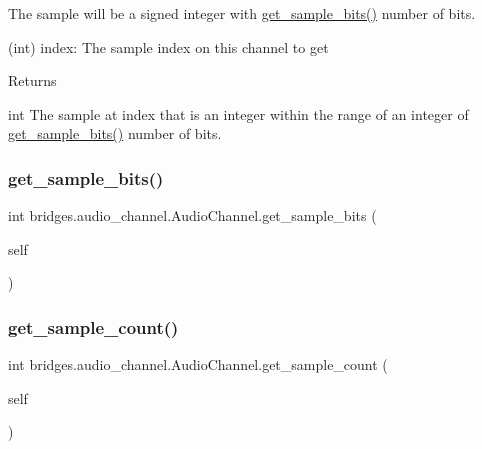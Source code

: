 The sample will be a signed integer with \mbox{\hyperlink{classbridges_1_1audio__channel_1_1_audio_channel_a6ee6a46e925354fd26f8f67e3357c2b4}{get\+\_\+sample\+\_\+bits()}} number of bits. \begin{DoxyVerb}           (int) index: The sample index on this channel to get
\end{DoxyVerb}
 \begin{DoxyReturn}{Returns}


int The sample at index that is an integer within the range of an integer of \mbox{\hyperlink{classbridges_1_1audio__channel_1_1_audio_channel_a6ee6a46e925354fd26f8f67e3357c2b4}{get\+\_\+sample\+\_\+bits()}} number of bits. 
\end{DoxyReturn}
\mbox{\label{classbridges_1_1audio__channel_1_1_audio_channel_a6ee6a46e925354fd26f8f67e3357c2b4}} 
\subsubsection{\texorpdfstring{get\_sample\_bits()}{get\_sample\_bits()}}
{\footnotesize\ttfamily  int bridges.\+audio\+\_\+channel.\+Audio\+Channel.\+get\+\_\+sample\+\_\+bits (\begin{DoxyParamCaption}\item[{}]{self }\end{DoxyParamCaption})}

\mbox{\label{classbridges_1_1audio__channel_1_1_audio_channel_a121180fc9b1432fe71f962ff7c97dd13}} 
\subsubsection{\texorpdfstring{get\_sample\_count()}{get\_sample\_count()}}
{\footnotesize\ttfamily  int bridges.\+audio\+\_\+channel.\+Audio\+Channel.\+get\+\_\+sample\+\_\+count (\begin{DoxyParamCaption}\item[{}]{self }\end{DoxyParamCaption})}



